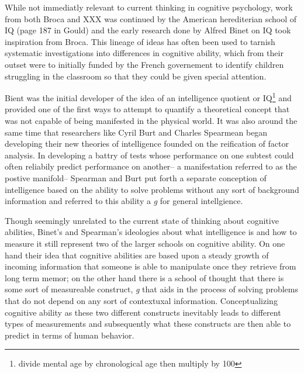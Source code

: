 \documentclass[]{book}
\let\rmarkdownfootnote\footnote%
\def\footnote{\protect\rmarkdownfootnote}
\begin{document}
While not immediatly relevant to current thinking in cognitive psychology, work from both Broca and XXX was continued by the American herediterian school of IQ (page 187 in Gould) and the early research done by Alfred Binet on IQ took inspiration from Broca.
This lineage of ideas has often been used to tarnish systematic investigations into differences in cognitive ability, which from their outset were to initially funded by the French governement to identify children struggling in the classroom so that they could be given special attention.

Bient was the initial developer of the idea of an intelligence quotient or IQ\footnote{divide mental age by chronological age then multiply by 100} and provided one of the first ways to attempt to quantify a theoretical concept that was not capable of being manifested in the physical world.
It was also around the same time that researchers like Cyril Burt and Charles Spearmean began developing their new theories of intelligence founded on the reification of factor analysis.
In developing a battry of tests whose performance on one subtest could often reliabily predict performance on another-- a manifestation referred to as the postive manifold-- Spearman and Burt put forth a separate conception of intelligence based on the ability to solve problems without any sort of background information and referred to this ability a \emph{g} for general intellgience.

Though seemingly unrelated to the current state of thinking about cognitive abilities, Binet's and Spearman's ideologies about what intelligence is and how to measure it still represent two of the larger schools on cognitive ability.
On one hand their idea that cognitive abilities are based upon a steady growth of incoming information that someone is able to manipulate once they retrieve from long term memor; on the other hand there is a school of thought that there is some sort of measureable construct, \emph{g} that aids in the process of solving problems that do not depend on any sort of contextuxal information.
Conceptualizing cognitive ability as these two different constructs inevitably leads to different types of measurements and subsequently what these constructs are then able to predict in terms of human behavior.
\end{document}
